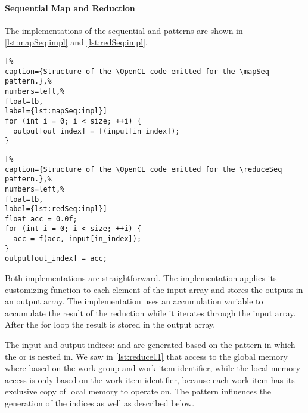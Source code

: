 \paragraph{Sequential Map and Reduction}
The \OpenCL implementations of the sequential \mapSeq and \reduceSeq patterns are shown in \autoref{lst:mapSeq:impl} and \autoref{lst:redSeq:impl}.
%
\begin{lstlisting}[%                                                             
caption={Structure of the \OpenCL code emitted for the \mapSeq pattern.},%
numbers=left,%
float=tb,
label={lst:mapSeq:impl}]
for (int i = 0; i < size; ++i) {
  output[out_index] = f(input[in_index]);
}
\end{lstlisting}
%
%
\begin{lstlisting}[%                                                             
caption={Structure of the \OpenCL code emitted for the \reduceSeq pattern.},%
numbers=left,%
float=tb,
label={lst:redSeq:impl}]
float acc = 0.0f;
for (int i = 0; i < size; ++i) {
  acc = f(acc, input[in_index]);
}
output[out_index] = acc;
\end{lstlisting}
%
Both implementations are straightforward.
The \mapSeq implementation applies its customizing function to each element of the input array and stores the outputs in an output array.
The \reduceSeq implementation uses an accumulation variable to accumulate the result of the reduction while it iterates through the input array.
After the for loop the result is stored in the output array.

The input and output indices:  and  are generated based on the pattern in which the \mapSeq or \reduceSeq is nested in.
We saw in \autoref{lst:reduce11} that access to the global memory where based on the work-group and work-item identifier, while the local memory access is only based on the work-item identifier, because each work-item has its exclusive copy of local memory to operate on.
The \reorderStride pattern influences the generation of the indices as well as described below.

